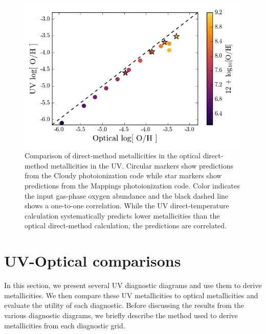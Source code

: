 \documentclass[preprint2]{aastex62}
\begin{document}
\begin{figure}
  \begin{center}
    \includegraphics[width=\linewidth]{figs/f1.png}
    \caption{Comparison of direct-method metallicities in the optical direct-method metallicities in the UV. Circular markers show predictions from the Cloudy photoionization code while star markers show predictions from the Mappings photoionization code. Color indicates the input gas-phase oxygen abundance and the black dashed line shows a one-to-one correlation. While the UV direct-temperature calculation systematically predicts lower metallicities than the optical direct-method calculation, the predictions are correlated.}
    \label{fig:UVoptZ}
  \end{center}
\end{figure}



\section{UV-Optical comparisons}\label{sec:UVOpt}

In this section, we present several UV diagnostic diagrams and use them to derive metallicities. We then compare these UV metallicities to optical metallicities and evaluate the utility of each diagnostic. Before discussing the results from the various diagnostic diagrams, we briefly describe the method used to derive metallicities from each diagnostic grid. 
\end{document}
